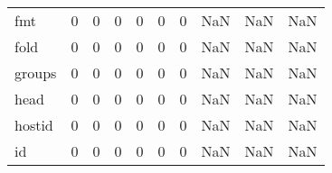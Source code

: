 \begin{longtable}{lrrrrrrrrr}
fmt       &                                       0 &                                                  0 &                                                  0 &                                                  0 &                                                  0 &                                                  0 &                                                NaN &                                    NaN &                                  NaN \\
fold      &                                       0 &                                                  0 &                                                  0 &                                                  0 &                                                  0 &                                                  0 &                                                NaN &                                    NaN &                                  NaN \\
groups    &                                       0 &                                                  0 &                                                  0 &                                                  0 &                                                  0 &                                                  0 &                                                NaN &                                    NaN &                                  NaN \\
head      &                                       0 &                                                  0 &                                                  0 &                                                  0 &                                                  0 &                                                  0 &                                                NaN &                                    NaN &                                  NaN \\
hostid    &                                       0 &                                                  0 &                                                  0 &                                                  0 &                                                  0 &                                                  0 &                                                NaN &                                    NaN &                                  NaN \\
id        &                                       0 &                                                  0 &                                                  0 &                                                  0 &                                                  0 &                                                  0 &                                                NaN &                                    NaN &                                  NaN \\

\end{longtable}

